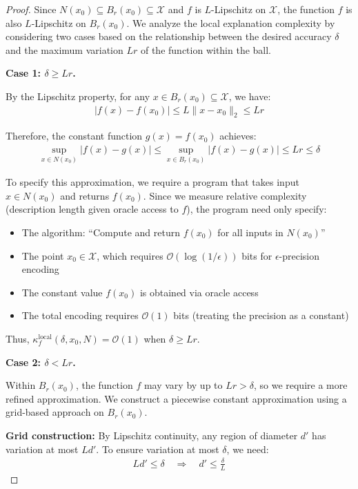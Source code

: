 \documentclass[10pt,a4paper]{amsart}
\begin{document}
\begin{proof}
Since $N(x_0) \subseteq B_r(x_0) \subseteq \mathcal{X}$ and $f$ is $L$-Lipschitz on $\mathcal{X}$, the function $f$ is also $L$-Lipschitz on $B_r(x_0)$. We analyze the local explanation complexity by considering two cases based on the relationship between the desired accuracy $\delta$ and the maximum variation $Lr$ of the function within the ball.

\textbf{Case 1: $\delta \geq Lr$.}

By the Lipschitz property, for any $x \in B_r(x_0) \subseteq \mathcal{X}$, we have:
\begin{align}
|f(x) - f(x_0)| \leq L \|x - x_0\|_2 \leq Lr
\end{align}

Therefore, the constant function $g(x) = f(x_0)$ achieves:
\begin{align}
\sup_{x \in N(x_0)} |f(x) - g(x)| \leq \sup_{x \in B_r(x_0)} |f(x) - g(x)| \leq Lr \leq \delta
\end{align}

To specify this approximation, we require a program that takes input $x \in N(x_0)$ and returns $f(x_0)$. Since we measure relative complexity (description length given oracle access to $f$), the program need only specify:
\begin{itemize}
\item The algorithm: ``Compute and return $f(x_0)$ for all inputs in $N(x_0)$''
\item The point $x_0 \in \mathcal{X}$, which requires $\mathcal{O}(\log(1/\epsilon))$ bits for $\epsilon$-precision encoding
\item The constant value $f(x_0)$ is obtained via oracle access
\item The total encoding requires $\mathcal{O}(1)$ bits (treating the precision as a constant)
\end{itemize}

Thus, $\kappa_f^{\text{local}}(\delta, x_0, N) = \mathcal{O}(1)$ when $\delta \geq Lr$.

\textbf{Case 2: $\delta < Lr$.}

Within $B_r(x_0)$, the function $f$ may vary by up to $Lr > \delta$, so we require a more refined approximation. We construct a piecewise constant approximation using a grid-based approach on $B_r(x_0)$.

\textbf{Grid construction:} By Lipschitz continuity, any region of diameter $d'$ has variation at most $Ld'$. To ensure variation at most $\delta$, we need:
\begin{align}
Ld' \leq \delta \quad \Rightarrow \quad d' \leq \frac{\delta}{L}
\end{align}


\end{proof}
\end{document}
